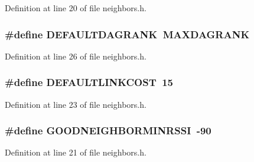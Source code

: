 Definition at line 20 of file neighbors.\+h.

\subsubsection[{\texorpdfstring{D\+E\+F\+A\+U\+L\+T\+D\+A\+G\+R\+A\+NK}{DEFAULTDAGRANK}}]{\setlength{\rightskip}{0pt plus 5cm}\#define D\+E\+F\+A\+U\+L\+T\+D\+A\+G\+R\+A\+NK~{\bf M\+A\+X\+D\+A\+G\+R\+A\+NK}}\hypertarget{group___neighbors_gacc9a3232f2dca59348d8b536005a2f89}{}\label{group___neighbors_gacc9a3232f2dca59348d8b536005a2f89}


Definition at line 26 of file neighbors.\+h.

\subsubsection[{\texorpdfstring{D\+E\+F\+A\+U\+L\+T\+L\+I\+N\+K\+C\+O\+ST}{DEFAULTLINKCOST}}]{\setlength{\rightskip}{0pt plus 5cm}\#define D\+E\+F\+A\+U\+L\+T\+L\+I\+N\+K\+C\+O\+ST~15}\hypertarget{group___neighbors_ga4d2874b0e44346069a08e6cf15d85d87}{}\label{group___neighbors_ga4d2874b0e44346069a08e6cf15d85d87}


Definition at line 23 of file neighbors.\+h.

\subsubsection[{\texorpdfstring{G\+O\+O\+D\+N\+E\+I\+G\+H\+B\+O\+R\+M\+I\+N\+R\+S\+SI}{GOODNEIGHBORMINRSSI}}]{\setlength{\rightskip}{0pt plus 5cm}\#define G\+O\+O\+D\+N\+E\+I\+G\+H\+B\+O\+R\+M\+I\+N\+R\+S\+SI~-\/90}\hypertarget{group___neighbors_ga6e36748acedcb5b5ca037ad19227aeec}{}\label{group___neighbors_ga6e36748acedcb5b5ca037ad19227aeec}


Definition at line 21 of file neighbors.\+h.

